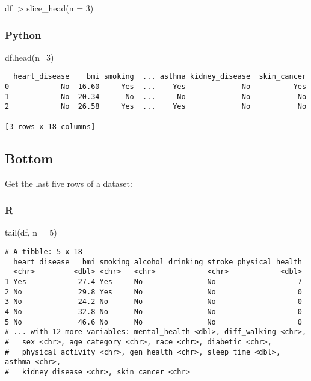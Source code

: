 \documentclass[
  letterpaper,
  DIV=11,
  numbers=noendperiod]{scrreprt}
\newenvironment{Shaded}{\begin{snugshade}}{\end{snugshade}}
\newcommand{\AttributeTok}[1]{\textcolor[rgb]{0.40,0.46,0.14}{#1}}
\newcommand{\DecValTok}[1]{\textcolor[rgb]{0.68,0.00,0.00}{#1}}
\newcommand{\FunctionTok}[1]{\textcolor[rgb]{0.28,0.35,0.67}{#1}}
\newcommand{\NormalTok}[1]{\textcolor[rgb]{0.00,0.46,0.62}{#1}}
\newcommand{\OperatorTok}[1]{\textcolor[rgb]{0.37,0.37,0.37}{#1}}
\newcommand{\SpecialCharTok}[1]{\textcolor[rgb]{0.37,0.37,0.37}{#1}}
\begin{document}
\begin{Shaded}
\begin{Highlighting}[]
\NormalTok{df }\SpecialCharTok{|\textgreater{}} \FunctionTok{slice\_head}\NormalTok{(}\AttributeTok{n =} \DecValTok{3}\NormalTok{)}
\end{Highlighting}
\end{Shaded}

\hypertarget{python-13}{%
\subsubsection{Python}\label{python-13}}

\begin{Shaded}
\begin{Highlighting}[]
\NormalTok{df.head(n}\OperatorTok{=}\DecValTok{3}\NormalTok{)}
\end{Highlighting}
\end{Shaded}

\begin{verbatim}
  heart_disease    bmi smoking  ... asthma kidney_disease  skin_cancer
0            No  16.60     Yes  ...    Yes             No          Yes
1            No  20.34      No  ...     No             No           No
2            No  26.58     Yes  ...    Yes             No           No

[3 rows x 18 columns]
\end{verbatim}

\hypertarget{bottom}{%
\subsection{Bottom}\label{bottom}}

Get the last five rows of a dataset:

\hypertarget{r-14}{%
\subsubsection{R}\label{r-14}}

\begin{Shaded}
\begin{Highlighting}[]
\FunctionTok{tail}\NormalTok{(df, }\AttributeTok{n =} \DecValTok{5}\NormalTok{)}
\end{Highlighting}
\end{Shaded}

\begin{verbatim}
# A tibble: 5 x 18
  heart_disease   bmi smoking alcohol_drinking stroke physical_health
  <chr>         <dbl> <chr>   <chr>            <chr>            <dbl>
1 Yes            27.4 Yes     No               No                   7
2 No             29.8 Yes     No               No                   0
3 No             24.2 No      No               No                   0
4 No             32.8 No      No               No                   0
5 No             46.6 No      No               No                   0
# ... with 12 more variables: mental_health <dbl>, diff_walking <chr>,
#   sex <chr>, age_category <chr>, race <chr>, diabetic <chr>,
#   physical_activity <chr>, gen_health <chr>, sleep_time <dbl>, asthma <chr>,
#   kidney_disease <chr>, skin_cancer <chr>
\end{verbatim}
\end{document}
